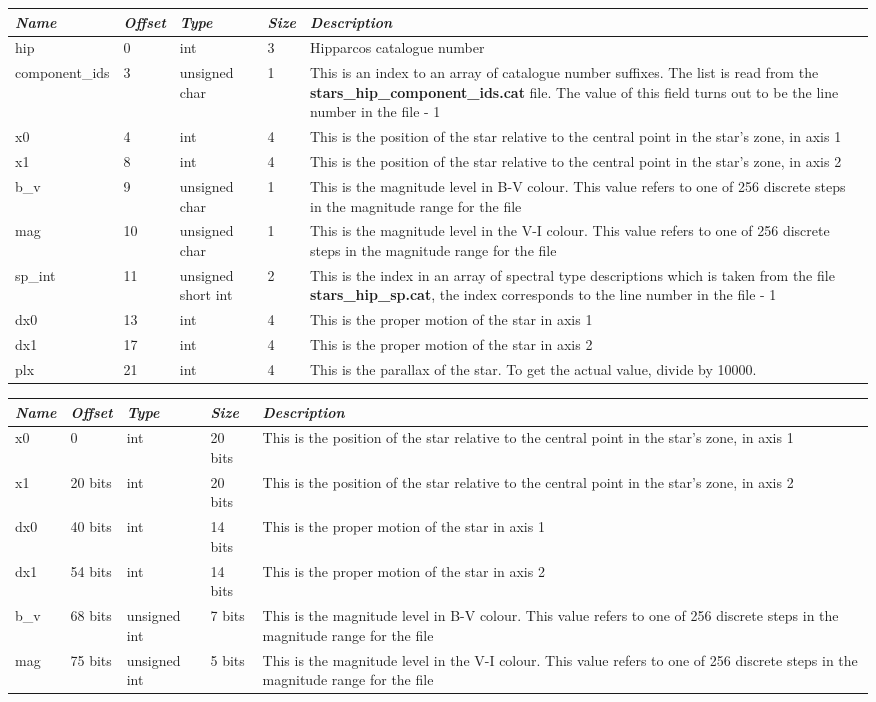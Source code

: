 \begin{longtabu} to \textwidth {l l l l X}
\toprule
\emph{Name} & \emph{Offset} & \emph{Type} & \emph{Size} &
\emph{Description}\tabularnewline
\midrule
hip & 0 & int & 3 & Hipparcos catalogue number\tabularnewline
\midrule
component\_ids & 3 & unsigned char & 1 & This is an index to an array of
catalogue number suffixes. The list is read from the
\textbf{stars\_hip\_component\_ids.cat} file. The value of this field
turns out to be the line number in the file - 1\tabularnewline
\midrule
x0 & 4 & int & 4 & This is the position of the star relative to the
central point in the star's zone, in axis 1\tabularnewline
\midrule
x1 & 8 & int & 4 & This is the position of the star relative to the
central point in the star's zone, in axis 2\tabularnewline
\midrule
b\_v & 9 & unsigned char & 1 & This is the magnitude level in B-V
colour. This value refers to one of 256 discrete steps in the magnitude
range for the file\tabularnewline
\midrule
mag & 10 & unsigned char & 1 & This is the magnitude level in the V-I
colour. This value refers to one of 256 discrete steps in the magnitude
range for the file\tabularnewline
\midrule
sp\_int & 11 & unsigned short int & 2 & This is the index in an array of
spectral type descriptions which is taken from the file
\textbf{stars\_hip\_sp.cat}, the index corresponds to the line number in
the file - 1\tabularnewline
\midrule
dx0 & 13 & int & 4 & This is the proper motion of the star in axis
1\tabularnewline
\midrule
dx1 & 17 & int & 4 & This is the proper motion of the star in axis
2\tabularnewline
\midrule
plx & 21 & int & 4 & This is the parallax of the star. To get the actual
value, divide by 10000.\tabularnewline
\bottomrule
\end{longtabu}

\begin{longtabu} to \textwidth {l l l l X}
\toprule
\emph{Name} & \emph{Offset} & \emph{Type} & \emph{Size} &
\emph{Description}\tabularnewline
\midrule
x0 & 0 & int & 20 bits & This is the position of the star relative to
the central point in the star's zone, in axis 1\tabularnewline
\midrule
x1 & 20 bits & int & 20 bits & This is the position of the star relative
to the central point in the star's zone, in axis 2\tabularnewline
\midrule
dx0 & 40 bits & int & 14 bits & This is the proper motion of the star in
axis 1\tabularnewline
\midrule
dx1 & 54 bits & int & 14 bits & This is the proper motion of the star in
axis 2\tabularnewline
\midrule
b\_v & 68 bits & unsigned int & 7 bits & This is the magnitude level in
B-V colour. This value refers to one of 256 discrete steps in the
magnitude range for the file\tabularnewline
\midrule
mag & 75 bits & unsigned int & 5 bits & This is the magnitude level in
the V-I colour. This value refers to one of 256 discrete steps in the
magnitude range for the file\tabularnewline
\bottomrule
\end{longtabu}

